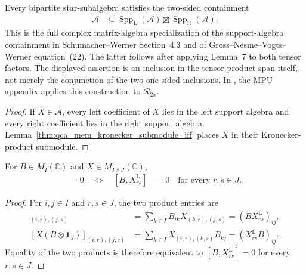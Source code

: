 \begin{lemma}
    \label{thm:qca_two_sided_support_containment}
    \leanok
    Every bipartite star-subalgebra satisfies the two-sided containment
    \begin{align}
        \mathcal A
         & \subseteq
        \operatorname{Spp}_{\mathrm L}(\mathcal A)
        \boxtimes
        \operatorname{Spp}_{\mathrm R}(\mathcal A).
    \end{align}
    This is the full complex matrix-algebra specialization of the
    support-algebra containment in Schumacher--Werner Section~4.3 and of
    Gross--Nesme--Vogts--Werner equation~(22).  The latter follows after
    applying Lemma~7 to both tensor factors.  The displayed assertion is an
    inclusion in the tensor-product span itself, not merely the conjunction of
    the two one-sided inclusions.  In \cite[lines~2320--2334]{Cirac2017MPU}, the MPU appendix applies this construction
    to
    $\mathcal R_{2x}$.
\end{lemma}

\begin{proof}\leanok
    If $X\in\mathcal A$, every left coefficient of $X$ lies in the left support
    algebra and every right coefficient lies in the right support algebra.
    Lemma~\ref{thm:qca_mem_kronecker_submodule_iff} places $X$ in their
    Kronecker-product submodule.
\end{proof}

\begin{lemma}
    \label{thm:qca_left_kronecker_commute_iff}
    \leanok
    For $B\in M_I(\mathbb C)$ and $X\in M_{I\times J}(\mathbb C)$,
    \begin{align}
        [B\otimes\mathbf 1_J,X]=0
        \quad\Longleftrightarrow\quad
        [B,X^{\mathrm L}_{rs}] & =0
        \quad\text{for every }r,s\in J.
    \end{align}
\end{lemma}

\begin{proof}\leanok
    For $i,j\in I$ and $r,s\in J$, the two product entries are
    \begin{align}
        [(B\otimes\mathbf 1_J)X]_{(i,r),(j,s)}
         & =\sum_{k\in I}B_{ik}X_{(k,r),(j,s)}
        =(BX^{\mathrm L}_{rs})_{ij},           \\
        [X(B\otimes\mathbf 1_J)]_{(i,r),(j,s)}
         & =\sum_{k\in I}X_{(i,r),(k,s)}B_{kj}
        =(X^{\mathrm L}_{rs}B)_{ij}.
    \end{align}
    Equality of the two products is therefore equivalent to
    $[B,X^{\mathrm L}_{rs}]=0$ for every $r,s\in J$.
\end{proof}

